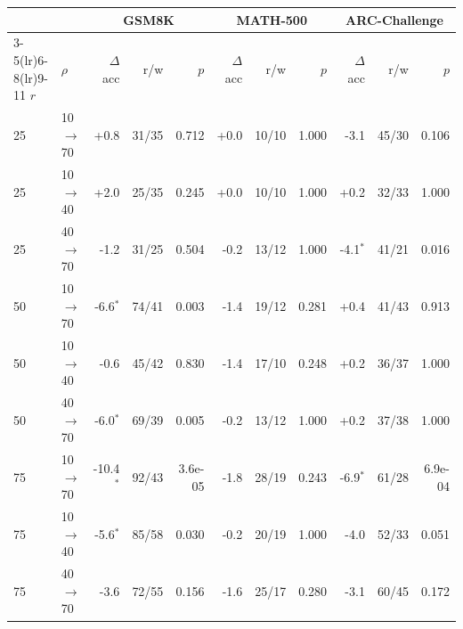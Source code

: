\begin{tabular}{ll rrr rrr rrr}
\toprule
& & \multicolumn{3}{c}{\textbf{GSM8K}} & \multicolumn{3}{c}{\textbf{MATH-500}} & \multicolumn{3}{c}{\textbf{ARC-Challenge}} \\
\cmidrule(lr){3-5}\cmidrule(lr){6-8}\cmidrule(lr){9-11}
\textbf{$r$} & \textbf{$\rho$} & $\Delta$acc & r/w & $p$ & $\Delta$acc & r/w & $p$ & $\Delta$acc & r/w & $p$ \\
\midrule
25 & 10$\to$70 & +0.8 & 31/35 & 0.712 & +0.0 & 10/10 & 1.000 & -3.1 & 45/30 & 0.106 \\
25 & 10$\to$40 & +2.0 & 25/35 & 0.245 & +0.0 & 10/10 & 1.000 & +0.2 & 32/33 & 1.000 \\
25 & 40$\to$70 & -1.2 & 31/25 & 0.504 & -0.2 & 13/12 & 1.000 & -4.1$^{*}$ & 41/21 & 0.016 \\
50 & 10$\to$70 & -6.6$^{*}$ & 74/41 & 0.003 & -1.4 & 19/12 & 0.281 & +0.4 & 41/43 & 0.913 \\
50 & 10$\to$40 & -0.6 & 45/42 & 0.830 & -1.4 & 17/10 & 0.248 & +0.2 & 36/37 & 1.000 \\
50 & 40$\to$70 & -6.0$^{*}$ & 69/39 & 0.005 & -0.2 & 13/12 & 1.000 & +0.2 & 37/38 & 1.000 \\
75 & 10$\to$70 & -10.4$^{*}$ & 92/43 & 3.6e-05 & -1.8 & 28/19 & 0.243 & -6.9$^{*}$ & 61/28 & 6.9e-04 \\
75 & 10$\to$40 & -5.6$^{*}$ & 85/58 & 0.030 & -0.2 & 20/19 & 1.000 & -4.0 & 52/33 & 0.051 \\
75 & 40$\to$70 & -3.6 & 72/55 & 0.156 & -1.6 & 25/17 & 0.280 & -3.1 & 60/45 & 0.172 \\
\bottomrule
\end{tabular}
